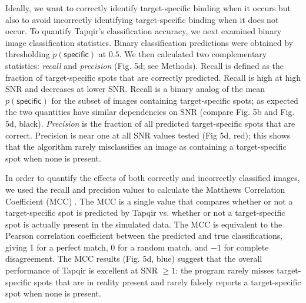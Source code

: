 Ideally, we want to correctly identify target-specific binding when it occurs but also to avoid incorrectly identifying target-specific binding when it does not occur. To quantify Tapqir's classification accuracy, we next examined binary image classification statistics. Binary classification predictions were obtained by thresholding $p(\mathsf{specific})$ at $0.5$. We then calculated two complementary statistics: \textit{recall} and \textit{precision} \cite{Fawcett2006-bq} (Fig. 5d; see Methods). Recall is defined as the fraction of target-specific spots that are correctly predicted. Recall is high at high SNR and decreases at lower SNR. Recall is a binary analog of the mean $p(\mathsf{specific})$ for the subset of images containing target-specific spots; as expected the two quantities have similar dependencies on SNR (compare Fig. 5b and Fig. 5d, black). \textit{Precision} is the fraction of all predicted target-specific spots that are correct. Precision is near one at all SNR values tested (Fig 5d, red); this shows that the algorithm rarely misclassifies an image as containing a target-specific spot when none is present. 

In order to quantify the effects of both correctly and incorrectly classified images, we used the recall and precision values to calculate the Matthews Correlation Coefficient (MCC) \cite{Matthews1975-rw}. The MCC is a single value that compares whether or not a target-specific spot is predicted by Tapqir vs. whether or not a target-specific spot is actually present in the simulated data. The MCC is equivalent to the Pearson correlation coefficient between the predicted and true classifications, giving 1 for a perfect match, 0 for a random match, and $-1$ for complete disagreement. The MCC results (Fig. 5d, blue) suggest that the overall performance of Tapqir is excellent at SNR $\ge 1$: the program rarely misses target-specific spots that are in reality present and rarely falsely reports a target-specific spot when none is present.  

